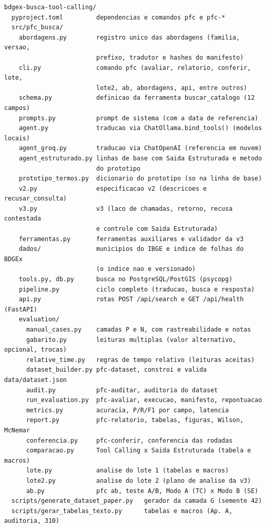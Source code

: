 {\footnotesize
\begin{verbatim}
bdgex-busca-tool-calling/
  pyproject.toml         dependencias e comandos pfc e pfc-*
  src/pfc_busca/
    abordagens.py        registro unico das abordagens (familia, versao,
                         prefixo, tradutor e hashes do manifesto)
    cli.py               comando pfc (avaliar, relatorio, conferir, lote,
                         lote2, ab, abordagens, api, entre outros)
    schema.py            definicao da ferramenta buscar_catalogo (12 campos)
    prompts.py           prompt de sistema (com a data de referencia)
    agent.py             traducao via ChatOllama.bind_tools() (modelos locais)
    agent_groq.py        traducao via ChatOpenAI (referencia em nuvem)
    agent_estruturado.py linhas de base com Saida Estruturada e metodo
                         do prototipo
    prototipo_termos.py  dicionario do prototipo (so na linha de base)
    v2.py                especificacao v2 (descricoes e recusar_consulta)
    v3.py                v3 (laco de chamadas, retorno, recusa contestada
                         e controle com Saida Estruturada)
    ferramentas.py       ferramentas auxiliares e validador da v3
    dados/               municipios do IBGE e indice de folhas do BDGEx
                         (o indice nao e versionado)
    tools.py, db.py      busca no PostgreSQL/PostGIS (psycopg)
    pipeline.py          ciclo completo (traducao, busca e resposta)
    api.py               rotas POST /api/search e GET /api/health (FastAPI)
    evaluation/
      manual_cases.py    camadas P e N, com rastreabilidade e notas
      gabarito.py        leituras multiplas (valor alternativo, opcional, trocas)
      relative_time.py   regras de tempo relativo (leituras aceitas)
      dataset_builder.py pfc-dataset, constroi e valida data/dataset.json
      audit.py           pfc-auditar, auditoria do dataset
      run_evaluation.py  pfc-avaliar, execucao, manifesto, repontuacao
      metrics.py         acuracia, P/R/F1 por campo, latencia
      report.py          pfc-relatorio, tabelas, figuras, Wilson, McNemar
      conferencia.py     pfc-conferir, conferencia das rodadas
      comparacao.py      Tool Calling x Saida Estruturada (tabela e macros)
      lote.py            analise do lote 1 (tabelas e macros)
      lote2.py           analise do lote 2 (plano de analise da v3)
      ab.py              pfc ab, teste A/B, Modo A (TC) x Modo B (SE)
  scripts/generate_dataset_paper.py   gerador da camada G (semente 42)
  scripts/gerar_tabelas_texto.py      tabelas e macros (Ap. A, auditoria, 310)

\end{verbatim}}

